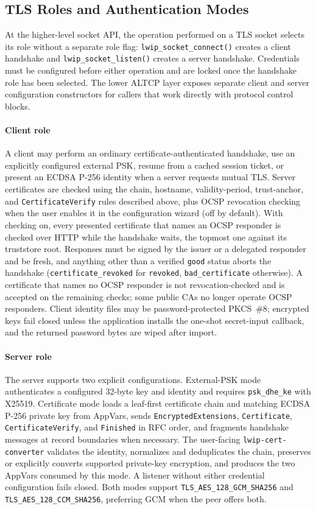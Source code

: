 \documentclass[titlepage]{report}
\begin{document}
	\subsection{TLS Roles and Authentication Modes}

	At the higher-level socket API, the operation performed on a TLS socket selects its role without a separate role flag: \texttt{lwip\_socket\_connect()} creates a client handshake and \texttt{lwip\_socket\_listen()} creates a server handshake. Credentials must be configured before either operation and are locked once the handshake role has been selected. The lower ALTCP layer exposes separate client and server configuration constructors for callers that work directly with protocol control blocks.

	\paragraph{Client role}
	A client may perform an ordinary certificate-authenticated handshake, use an explicitly configured external PSK, resume from a cached session ticket, or present an ECDSA P-256 identity when a server requests mutual TLS. Server certificates are checked using the chain, hostname, validity-period, trust-anchor, and \texttt{CertificateVerify} rules described above, plus OCSP revocation checking when the user enables it in the configuration wizard (off by default). With checking on, every presented certificate that names an OCSP responder is checked over HTTP while the handshake waits, the topmost one against its truststore root. Responses must be signed by the issuer or a delegated responder and be fresh, and anything other than a verified \texttt{good} status aborts the handshake (\texttt{certificate\_revoked} for \texttt{revoked}, \texttt{bad\_certificate} otherwise). A certificate that names no OCSP responder is not revocation-checked and is accepted on the remaining checks; some public CAs no longer operate OCSP responders. Client identity files may be password-protected PKCS~\#8; encrypted keys fail closed unless the application installs the one-shot secret-input callback, and the returned password bytes are wiped after import.

	\paragraph{Server role}
	The server supports two explicit configurations. External-PSK mode authenticates a configured 32-byte key and identity and requires \texttt{psk\_dhe\_ke} with X25519. Certificate mode loads a leaf-first certificate chain and matching ECDSA P-256 private key from AppVars, sends \texttt{EncryptedExtensions}, \texttt{Certificate}, \texttt{CertificateVerify}, and \texttt{Finished} in RFC order, and fragments handshake messages at record boundaries when necessary. The user-facing \texttt{lwip-cert-converter} validates the identity, normalizes and deduplicates the chain, preserves or explicitly converts supported private-key encryption, and produces the two AppVars consumed by this mode. A listener without either credential configuration fails closed. Both modes support \texttt{TLS\_AES\_128\_GCM\_SHA256} and \texttt{TLS\_AES\_128\_CCM\_SHA256}, preferring GCM when the peer offers both.
\end{document}
